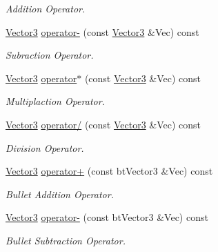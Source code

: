 \begin{DoxyCompactItemize}
\begin{DoxyCompactList}\small\item\em Addition Operator. \item\end{DoxyCompactList}\item 
\hyperlink{classphys_1_1Vector3}{Vector3} \hyperlink{classphys_1_1Vector3_a8dd6dad4d32d2c7045a31e8fbdc16b8f}{operator-\/} (const \hyperlink{classphys_1_1Vector3}{Vector3} \&Vec) const 
\begin{DoxyCompactList}\small\item\em Subraction Operator. \item\end{DoxyCompactList}\item 
\hyperlink{classphys_1_1Vector3}{Vector3} \hyperlink{classphys_1_1Vector3_a19eef355e6376acfb1d631aab63fdea5}{operator$\ast$} (const \hyperlink{classphys_1_1Vector3}{Vector3} \&Vec) const 
\begin{DoxyCompactList}\small\item\em Multiplaction Operator. \item\end{DoxyCompactList}\item 
\hyperlink{classphys_1_1Vector3}{Vector3} \hyperlink{classphys_1_1Vector3_a75bb5dd58d66a039a1a651398417110f}{operator/} (const \hyperlink{classphys_1_1Vector3}{Vector3} \&Vec) const 
\begin{DoxyCompactList}\small\item\em Division Operator. \item\end{DoxyCompactList}\item 
\hyperlink{classphys_1_1Vector3}{Vector3} \hyperlink{classphys_1_1Vector3_a88fd674d6a8eaf2d256bdd10f7f8d05a}{operator+} (const btVector3 \&Vec) const 
\begin{DoxyCompactList}\small\item\em Bullet Addition Operator. \item\end{DoxyCompactList}\item 
\hyperlink{classphys_1_1Vector3}{Vector3} \hyperlink{classphys_1_1Vector3_affbba2c1aa5dd5cd788f4f7e440cd52e}{operator-\/} (const btVector3 \&Vec) const 
\begin{DoxyCompactList}\small\item\em Bullet Subtraction Operator. \item\end{DoxyCompactList}\item 

\end{DoxyCompactItemize}
